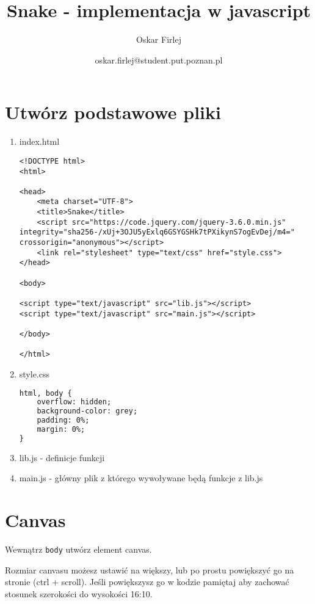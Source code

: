 \documentclass[12pt]{article}
\title{Snake - implementacja w javascript}
\author{Oskar Firlej}
\date{oskar.firlej@student.put.poznan.pl}
\begin{document}
\maketitle

\section{Utwórz podstawowe pliki}

\begin{enumerate}

\item index.html
\begin{verbatim}
<!DOCTYPE html>
<html>

<head>
    <meta charset="UTF-8">
    <title>Snake</title>
    <script src="https://code.jquery.com/jquery-3.6.0.min.js" integrity="sha256-/xUj+3OJU5yExlq6GSYGSHk7tPXikynS7ogEvDej/m4=" crossorigin="anonymous"></script>
    <link rel="stylesheet" type="text/css" href="style.css">
</head>

<body>

<script type="text/javascript" src="lib.js"></script>
<script type="text/javascript" src="main.js"></script>

</body>

</html>
\end{verbatim} 

\item style.css

\begin{lstlisting}[language=html]
html, body {
    overflow: hidden;
    background-color: grey;
    padding: 0%;
    margin: 0%;
}
\end{lstlisting}

\item lib.js - definicje funkcji
\item main.js - główny plik z którego wywoływane będą funkcje z lib.js

\end{enumerate}
	
\section{Canvas}

Wewnątrz \texttt{body} utwórz element canvas.

Rozmiar canvasu możesz ustawić na większy, lub po prostu powiększyć go na stronie (ctrl + scroll). Jeśli powiększysz go w kodzie pamiętaj aby zachować stosunek szerokości do wysokości 16:10.
\end{document}
